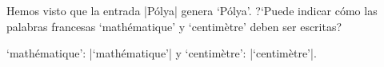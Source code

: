  


\bigskip

Hemos visto que la entrada |P\'olya| genera `P\'olya'.
?`Puede indicar c\'omo las palabras francesas `math\'ematique' y `centim\`etre'
deben ser escritas?

\bigskip

 `math\'ematique': |`math\'ematique'| y `centim\`etre':
|`centim\`etre'|.

\bye